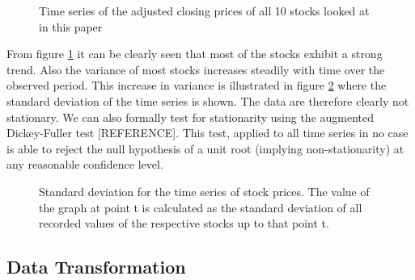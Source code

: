 \begin{figure}[h]
    \centering
    \begin{adjustbox}{width=.9\textwidth,center}
    
    \end{adjustbox}  
    \caption{Time series of the adjusted closing prices of all 10 stocks looked at in this paper}
    \label{fig:Daily Stock Prices for all Stocks in the Data Set}
\end{figure}{}

From figure \ref{fig:Daily Stock Prices for all Stocks in the Data Set} it can be clearly seen that most of the stocks exhibit a strong trend. Also the variance of most stocks increases steadily with time over the observed period. This increase in variance is illustrated in figure \ref{fig:cum_sd_all} where the standard deviation of the time series is shown. The data are therefore clearly not stationary. We can also formally test for stationarity using the augmented Dickey-Fuller test [REFERENCE]. This test, applied to all time series in no case is able to reject the null hypothesis of a unit root (implying non-stationarity) at any reasonable confidence level. 

\begin{figure}[H]
    \centering
    \begin{adjustbox}{width=.9\textwidth,center}
    
    \end{adjustbox}  
    \caption{Standard deviation for the time series of stock prices. The value of the graph at point t is calculated as the standard deviation of all recorded values of the respective stocks up to that point t.}
    \label{fig:cum_sd_all}
\end{figure}{}

\subsection{Data Transformation}

